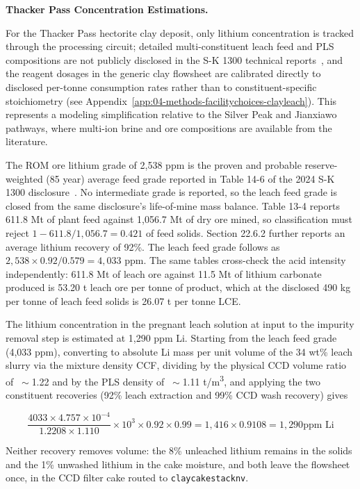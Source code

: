 \documentclass{article}
\renewcommand\_{\textunderscore\allowbreak}
\begin{document}
\medskip
\noindent\textbf{Thacker Pass Concentration Estimations.}\quad

For the Thacker Pass hectorite clay deposit, only lithium concentration is tracked through the processing circuit; detailed multi-constituent leach feed and PLS compositions are not publicly disclosed in the S-K 1300 technical reports~\cite{sgscanadaincSK1300Technical2024, rothFeasibilityStudyNational2022}, and the reagent dosages in the generic clay flowsheet are calibrated directly to disclosed per-tonne consumption rates rather than to constituent-specific stoichiometry (see Appendix~\ref{app:04-methods-facilitychoices-clayleach}). This represents a modeling simplification relative to the Silver Peak and Jianxiawo pathways, where multi-ion brine and ore compositions are available from the literature.

The ROM ore lithium grade of 2,538 ppm is the proven and probable reserve-weighted (85 year) average feed grade reported in Table 14-6 of the 2024 S-K 1300 disclosure~\cite{sgscanadaincSK1300Technical2024}. No intermediate grade is reported, so the leach feed grade is closed from the same disclosure's life-of-mine mass balance. Table 13-4 reports 611.8 Mt of plant feed against 1,056.7 Mt of dry ore mined, so classification must reject $1-611.8/1,056.7=0.421$ of feed solids. Section 22.6.2 further reports an average lithium recovery of 92\%. The leach feed grade follows as $2,538 \times 0.92/0.579 = 4,033$ ppm. The same tables cross-check the acid intensity independently: 611.8 Mt of leach ore against 11.5 Mt of lithium carbonate produced is 53.20 t leach ore per tonne of product, which at the disclosed 490 kg  per tonne of leach feed solids is 26.07 t  per tonne LCE.

The lithium concentration in the pregnant leach solution at input to the impurity removal step is estimated at 1,290 ppm Li. Starting from the leach feed grade (4,033 ppm), converting to absolute Li mass per unit volume of the 34 wt\% leach slurry via the mixture density CCF, dividing by the physical CCD volume ratio of $~\sim$1.22 and by the PLS density of $~\sim$1.11 \si{t/m^3}, and applying the two constituent recoveries (92\% leach extraction and 99\% CCD wash recovery) gives 

$$\frac{4033 \times 4.757 \times 10^{-4}}{1.2208 \times 1.110} \times 10^{3} \times 0.92 \times 0.99 = 1,416 \times 0.9108 = 1,290 \text{ppm Li}$$

Neither recovery removes volume: the 8\% unleached lithium remains in the solids and the 1\% unwashed lithium in the cake moisture, and both leave the flowsheet once, in the CCD filter cake routed to \texttt{claycake\_stack\_nv\_62}.
\end{document}
